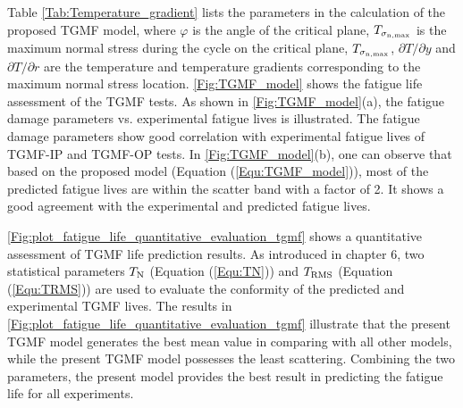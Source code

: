 \documentclass[preprint,5p,twocolumn,11pt,sort&compress]{elsarticle}
\begin{document}
Table \autoref{Tab:Temperature_gradient} lists the parameters in the calculation of the proposed TGMF model, where $\varphi$ is the angle of the critical plane, $T_{\sigma_{\rm n,\max}}$ is the maximum normal stress during the cycle on the critical plane, $T_{\sigma_{\rm n,\max}}$, $\partial T/\partial y$ and $\partial T/\partial r$ are the temperature and temperature gradients corresponding to the maximum normal stress location.
\autoref{Fig:TGMF_model} shows the fatigue life assessment of the TGMF tests. As shown in \autoref{Fig:TGMF_model}(a), the fatigue damage parameters vs. experimental fatigue lives is illustrated. The fatigue damage parameters show good correlation with experimental fatigue lives of TGMF-IP and TGMF-OP tests. In \autoref{Fig:TGMF_model}(b), one can observe that based on the proposed model (Equation (\autoref{Equ:TGMF_model})), most of the predicted fatigue lives are within the scatter band with a factor of 2. It shows a good agreement with the experimental and predicted fatigue lives.

\autoref{Fig:plot_fatigue_life_quantitative_evaluation_tgmf} shows a quantitative assessment of TGMF life prediction results. As introduced in chapter 6, two statistical parameters ${T_{\rm N}}$ (Equation (\autoref{Equ:TN})) and ${T_{\rm RMS}}$ (Equation (\autoref{Equ:TRMS})) are used to evaluate the conformity of the predicted and experimental TGMF lives. The results in \autoref{Fig:plot_fatigue_life_quantitative_evaluation_tgmf} illustrate that the present TGMF model generates the best mean value in comparing with all other models, while the present TGMF model possesses the least scattering. Combining the two parameters, the present model provides the best result in predicting the fatigue life for all experiments.
\end{document}
